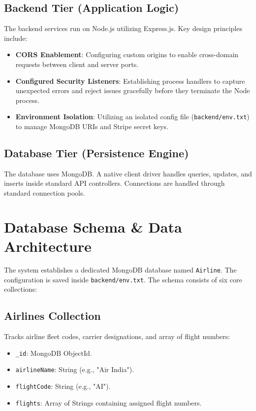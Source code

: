 \documentclass[12pt,a4paper]{article}
\begin{document}
\subsection{Backend Tier (Application Logic)}
The backend services run on Node.js utilizing Express.js. Key design principles include:
\begin{itemize}
    \item \textbf{CORS Enablement}: Configuring custom origins to enable cross-domain requests between client and server ports.
    \item \textbf{Configured Security Listeners}: Establishing process handlers to capture unexpected errors and reject issues gracefully before they terminate the Node process.
    \item \textbf{Environment Isolation}: Utilizing an isolated config file (\texttt{backend/env.txt}) to manage MongoDB URIs and Stripe secret keys.
\end{itemize}

\subsection{Database Tier (Persistence Engine)}
The database uses MongoDB. A native client driver handles queries, updates, and inserts inside standard API controllers. Connections are handled through standard connection pools.

\newpage
\section{Database Schema \& Data Architecture}
The system establishes a dedicated MongoDB database named \texttt{Airline}. The configuration is saved inside \texttt{backend/env.txt}. The schema consists of six core collections:

\subsection{Airlines Collection}
Tracks airline fleet codes, carrier designations, and array of flight numbers:
\begin{itemize}
    \item \texttt{\_id}: MongoDB ObjectId.
    \item \texttt{airlineName}: String (e.g., "Air India").
    \item \texttt{flightCode}: String (e.g., "AI").
    \item \texttt{flights}: Array of Strings containing assigned flight numbers.
\end{itemize}
\end{document}
